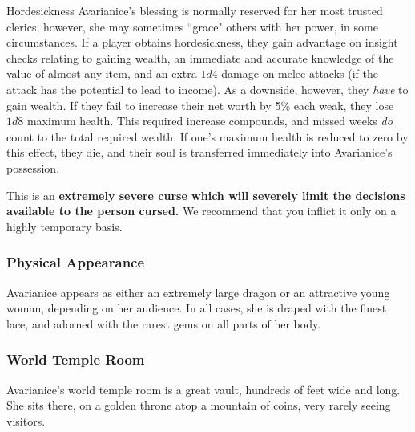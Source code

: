 \begin{adventureidea}{Hordesickness}
Avarianice's blessing is normally reserved for her most trusted clerics, however, she may sometimes ``grace" others with her power, in some circumstances.
If a player obtains hordesickness, they gain advantage on insight checks relating to gaining wealth, an immediate and accurate knowledge of the value of almost any item, and an extra $ 1d4 $ damage on melee attacks (if the attack has the potential to lead to income).
As a downside, however, they \textit{have} to gain wealth.
If they fail to increase their net worth by 5\% each weak, they lose $1d8$ maximum health.
This required increase compounds, and missed weeks \textit{do} count to the total required wealth.
If one's maximum health is reduced to zero by this effect, they die, and their soul is transferred immediately into Avarianice's possession.

This is an \textbf{extremely severe curse which will severely limit the decisions available to the person cursed.}
We recommend that you inflict it only on a highly temporary basis.
\end{adventureidea}

\subsubsection*{Physical Appearance}
Avarianice appears as either an extremely large dragon or an attractive young woman, depending on her audience.
In all cases, she is draped with the finest lace, and adorned with the rarest gems on all parts of her body.

\subsubsection*{World Temple Room}
Avarianice's world temple room is a great vault, hundreds of feet wide and long.
She sits there, on a golden throne atop a mountain of coins, very rarely seeing visitors.


